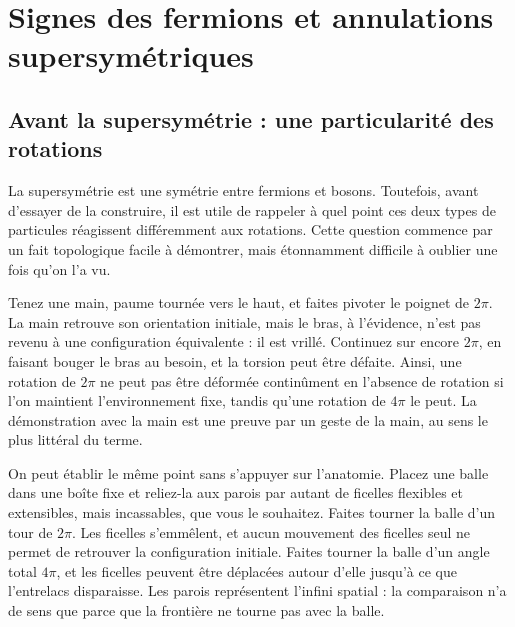 \chapter{Signes des fermions et annulations supersymétriques}


\section{Avant la supersymétrie : une particularité des rotations}

La supersymétrie est une symétrie entre fermions et bosons. Toutefois, avant d’essayer de la construire, il est utile de rappeler à quel point ces deux types de particules réagissent différemment aux rotations. Cette question commence par un fait topologique facile à démontrer, mais étonnamment difficile à oublier une fois qu’on l’a vu.

Tenez une main, paume tournée vers le haut, et faites pivoter le poignet de \(2\pi\). La main retrouve son orientation initiale, mais le bras, à l’évidence, n’est pas revenu à une configuration équivalente : il est vrillé. Continuez sur encore \(2\pi\), en faisant bouger le bras au besoin, et la torsion peut être défaite. Ainsi, une rotation de \(2\pi\) ne peut pas être déformée continûment en l’absence de rotation si l’on maintient l’environnement fixe, tandis qu’une rotation de \(4\pi\) le peut. La démonstration avec la main est une preuve par un geste de la main, au sens le plus littéral du terme.

On peut établir le même point sans s’appuyer sur l’anatomie. Placez une balle dans une boîte fixe et reliez-la aux parois par autant de ficelles flexibles et extensibles, mais incassables, que vous le souhaitez. Faites tourner la balle d’un tour de \(2\pi\). Les ficelles s’emmêlent, et aucun mouvement des ficelles seul ne permet de retrouver la configuration initiale. Faites tourner la balle d’un angle total \(4\pi\), et les ficelles peuvent être déplacées autour d’elle jusqu’à ce que l’entrelacs disparaisse. Les parois représentent l’infini spatial : la comparaison n’a de sens que parce que la frontière ne tourne pas avec la balle.

